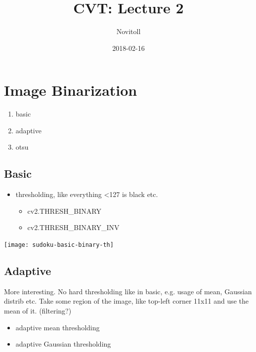 \documentclass{article}
\title{CVT: Lecture 2}
\date{2018-02-16}
\author{Novitoll}
\begin{document}
    \maketitle

    \section{Image Binarization}

    \begin{enumerate}
        \item basic
        \item adaptive
        \item otsu
    \end{enumerate}

    \subsection{Basic}

        \begin{itemize}
            \item thresholding, like everything \textless 127 is black etc.
            \begin{itemize}
                \item cv2.THRESH\_BINARY
                \item cv2.THRESH\_BINARY\_INV
            \end{itemize}
        \end{itemize}

    \texttt{[image: sudoku-basic-binary-th]}

    \subsection{Adaptive}

    More interesting. No hard thresholding like in basic, e.g. usage of mean, Gaussian distrib etc.
    Take some region of the image, like top-left corner 11x11 and use the mean of it. (filtering?)

    \begin{itemize}
        \item adaptive mean thresholding
    \end{itemize}

    \begin{itemize}
        \item adaptive Gaussian thresholding
    \end{itemize}
\end{document}
